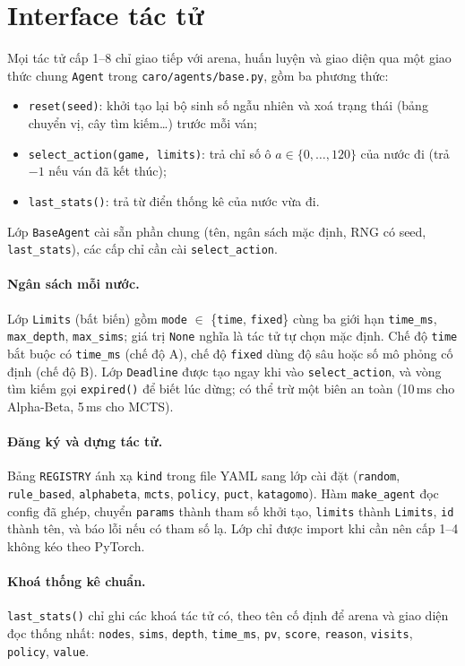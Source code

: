 \section{Interface tác tử}
Mọi tác tử cấp 1--8 chỉ giao tiếp với arena, huấn luyện và giao diện qua một giao thức chung \texttt{Agent} trong \texttt{caro/agents/base.py}, gồm ba phương thức:
\begin{itemize}
  \item \texttt{reset(seed)}: khởi tạo lại bộ sinh số ngẫu nhiên và xoá trạng thái (bảng chuyển vị, cây tìm kiếm\ldots) trước mỗi ván;
  \item \texttt{select\_action(game, limits)}: trả chỉ số ô $a \in \{0,\dots,120\}$ của nước đi (trả $-1$ nếu ván đã kết thúc);
  \item \texttt{last\_stats()}: trả từ điển thống kê của nước vừa đi.
\end{itemize}
Lớp \texttt{BaseAgent} cài sẵn phần chung (tên, ngân sách mặc định, RNG có seed, \texttt{last\_stats}), các cấp chỉ cần cài \texttt{select\_action}.

\paragraph{Ngân sách mỗi nước.}
Lớp \texttt{Limits} (bất biến) gồm \texttt{mode} $\in$ \{\texttt{time}, \texttt{fixed}\} cùng ba giới hạn \texttt{time\_ms}, \texttt{max\_depth}, \texttt{max\_sims}; giá trị \texttt{None} nghĩa là tác tử tự chọn mặc định. Chế độ \texttt{time} bắt buộc có \texttt{time\_ms} (chế độ A), chế độ \texttt{fixed} dùng độ sâu hoặc số mô phỏng cố định (chế độ B). Lớp \texttt{Deadline} được tạo ngay khi vào \texttt{select\_action}, và vòng tìm kiếm gọi \texttt{expired()} để biết lúc dừng; có thể trừ một biên an toàn (10\,ms cho Alpha-Beta, 5\,ms cho MCTS).

\paragraph{Đăng ký và dựng tác tử.}
Bảng \texttt{REGISTRY} ánh xạ \texttt{kind} trong file YAML sang lớp cài đặt (\texttt{random}, \texttt{rule\_based}, \texttt{alphabeta}, \texttt{mcts}, \texttt{policy}, \texttt{puct}, \texttt{katagomo}). Hàm \texttt{make\_agent} đọc config đã ghép, chuyển \texttt{params} thành tham số khởi tạo, \texttt{limits} thành \texttt{Limits}, \texttt{id} thành tên, và báo lỗi nếu có tham số lạ. Lớp chỉ được import khi cần nên cấp 1--4 không kéo theo PyTorch.

\paragraph{Khoá thống kê chuẩn.}
\texttt{last\_stats()} chỉ ghi các khoá tác tử có, theo tên cố định để arena và giao diện đọc thống nhất: \texttt{nodes}, \texttt{sims}, \texttt{depth}, \texttt{time\_ms}, \texttt{pv}, \texttt{score}, \texttt{reason}, \texttt{visits}, \texttt{policy}, \texttt{value}.

